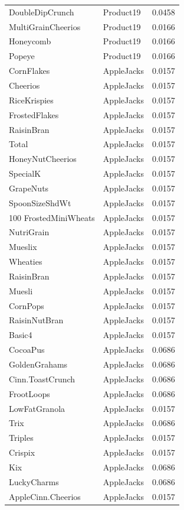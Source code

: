 \begin{longtable}{llr}
DoubleDipCrunch & Product19 & 0.0458 \\
MultiGrainCheerios & Product19 & 0.0166 \\
Honeycomb & Product19 & 0.0166 \\
Popeye & Product19 & 0.0166 \\
CornFlakes & AppleJacks & 0.0157 \\
Cheerios & AppleJacks & 0.0157 \\
RiceKrispies & AppleJacks & 0.0157 \\
FrostedFlakes & AppleJacks & 0.0157 \\
RaisinBran & AppleJacks & 0.0157 \\
Total & AppleJacks & 0.0157 \\
HoneyNutCheerios & AppleJacks & 0.0157 \\
SpecialK & AppleJacks & 0.0157 \\
GrapeNuts & AppleJacks & 0.0157 \\
SpoonSizeShdWt & AppleJacks & 0.0157 \\
100%
FrostedMiniWheats & AppleJacks & 0.0157 \\
NutriGrain & AppleJacks & 0.0157 \\
Mueslix & AppleJacks & 0.0157 \\
Wheaties & AppleJacks & 0.0157 \\
RaisinBran & AppleJacks & 0.0157 \\
Muesli & AppleJacks & 0.0157 \\
CornPops & AppleJacks & 0.0157 \\
RaisinNutBran & AppleJacks & 0.0157 \\
Basic4 & AppleJacks & 0.0157 \\
CocoaPus & AppleJacks & 0.0686 \\
GoldenGrahams & AppleJacks & 0.0686 \\
Cinn.ToastCrunch & AppleJacks & 0.0686 \\
FrootLoops & AppleJacks & 0.0686 \\
LowFatGranola & AppleJacks & 0.0157 \\
Trix & AppleJacks & 0.0686 \\
Triples & AppleJacks & 0.0157 \\
Crispix & AppleJacks & 0.0157 \\
Kix & AppleJacks & 0.0686 \\
LuckyCharms & AppleJacks & 0.0686 \\
AppleCinn.Cheerios & AppleJacks & 0.0157 \\

\end{longtable}
